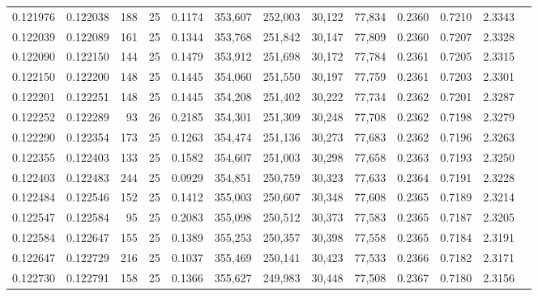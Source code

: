 \begin{tabular}{rrrrrrrrrrrrr}
0.121976 & 0.122038 &   188 &  25 &                                     0.1174 & 353,607 & 252,003 &  30,122 &  77,834 & 0.2360 & 0.7210 & 2.3343 \\
0.122039 & 0.122089 &   161 &  25 &                                     0.1344 & 353,768 & 251,842 &  30,147 &  77,809 & 0.2360 & 0.7207 & 2.3328 \\
0.122090 & 0.122150 &   144 &  25 &                                     0.1479 & 353,912 & 251,698 &  30,172 &  77,784 & 0.2361 & 0.7205 & 2.3315 \\
0.122150 & 0.122200 &   148 &  25 &                                     0.1445 & 354,060 & 251,550 &  30,197 &  77,759 & 0.2361 & 0.7203 & 2.3301 \\
0.122201 & 0.122251 &   148 &  25 &                                     0.1445 & 354,208 & 251,402 &  30,222 &  77,734 & 0.2362 & 0.7201 & 2.3287 \\
0.122252 & 0.122289 &    93 &  26 &                                     0.2185 & 354,301 & 251,309 &  30,248 &  77,708 & 0.2362 & 0.7198 & 2.3279 \\
0.122290 & 0.122354 &   173 &  25 &                                     0.1263 & 354,474 & 251,136 &  30,273 &  77,683 & 0.2362 & 0.7196 & 2.3263 \\
0.122355 & 0.122403 &   133 &  25 &                                     0.1582 & 354,607 & 251,003 &  30,298 &  77,658 & 0.2363 & 0.7193 & 2.3250 \\
0.122403 & 0.122483 &   244 &  25 &                                     0.0929 & 354,851 & 250,759 &  30,323 &  77,633 & 0.2364 & 0.7191 & 2.3228 \\
0.122484 & 0.122546 &   152 &  25 &                                     0.1412 & 355,003 & 250,607 &  30,348 &  77,608 & 0.2365 & 0.7189 & 2.3214 \\
0.122547 & 0.122584 &    95 &  25 &                                     0.2083 & 355,098 & 250,512 &  30,373 &  77,583 & 0.2365 & 0.7187 & 2.3205 \\
0.122584 & 0.122647 &   155 &  25 &                                     0.1389 & 355,253 & 250,357 &  30,398 &  77,558 & 0.2365 & 0.7184 & 2.3191 \\
0.122647 & 0.122729 &   216 &  25 &                                     0.1037 & 355,469 & 250,141 &  30,423 &  77,533 & 0.2366 & 0.7182 & 2.3171 \\
0.122730 & 0.122791 &   158 &  25 &                                     0.1366 & 355,627 & 249,983 &  30,448 &  77,508 & 0.2367 & 0.7180 & 2.3156 \\

\end{tabular}
